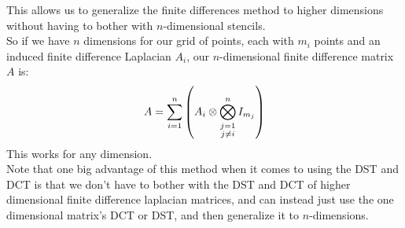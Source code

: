 \documentclass[12pt]{article}
\begin{document}
This allows us to generalize the finite differences
method to higher dimensions without having
to bother with $n$-dimensional stencils. \\
So if we have $n$ dimensions for our
grid of points, each with $m_i$
points and an induced finite difference
Laplacian $A_i$, our $n$-dimensional
finite difference matrix $A$ is:
\[ A = \sum_{i=1}^n \left( A_i \otimes 
\bigotimes_{\substack{j=1 \\ j \neq i}}^n I_{m_j} \right)  \]
This works for any dimension. \\

Note that one big advantage of this method
when it comes to using the DST and DCT is that
we don't have to bother with the DST and DCT
of higher dimensional finite difference laplacian 
matrices, and can instead just use the one 
dimensional  matrix's DCT or DST, and then 
generalize it to $n$-dimensions. \\

\newpage
\end{document}

